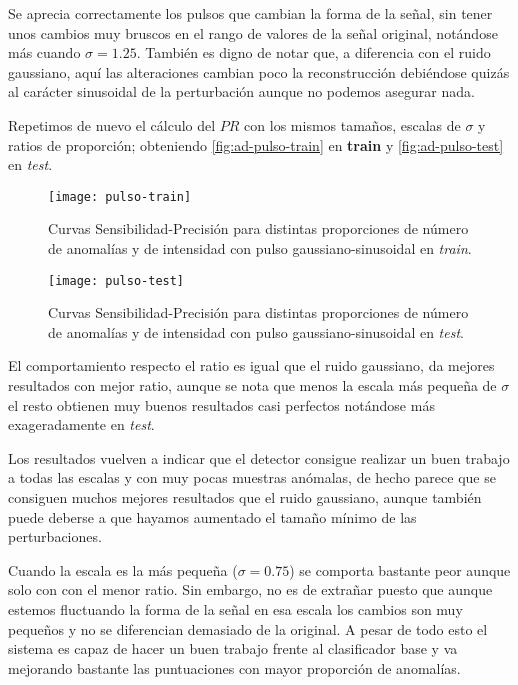 Se aprecia correctamente los pulsos que cambian la forma de la señal, sin tener unos cambios muy bruscos en el rango de valores de la señal original, notándose más cuando $\sigma = 1.25$. También es digno de notar que, a diferencia con el ruido gaussiano, aquí las alteraciones cambian poco la reconstrucción debiéndose quizás al carácter sinusoidal de la perturbación aunque no podemos asegurar nada.

Repetimos de nuevo el cálculo del $PR$ con los mismos tamaños, escalas de $\sigma$ y ratios de proporción; obteniendo \autoref{fig:ad-pulso-train} en \textbf{train} y \autoref{fig:ad-pulso-test} en \emph{test}.

\begin{figure}[htpb]
  \centering
  \texttt{[image: pulso-train]}
  \caption{Curvas Sensibilidad-Precisión para distintas proporciones de número de anomalías y de intensidad con pulso gaussiano-sinusoidal en \emph{train}.}
  \label{fig:ad-pulso-train}
\end{figure}

\begin{figure}[htpb]
  \centering
  \texttt{[image: pulso-test]}
  \caption{Curvas Sensibilidad-Precisión para distintas proporciones de número de anomalías y de intensidad con pulso gaussiano-sinusoidal en \emph{test}.}
  \label{fig:ad-pulso-test}
\end{figure}

El comportamiento respecto el ratio es igual que el ruido gaussiano, da mejores resultados con mejor ratio, aunque se nota que menos la escala más pequeña de $\sigma$ el resto obtienen muy buenos resultados casi perfectos notándose más exageradamente en \emph{test}.

Los resultados vuelven a indicar que el detector consigue realizar un buen trabajo a todas las escalas y con muy pocas muestras anómalas, de hecho parece que se consiguen muchos mejores resultados que el ruido gaussiano, aunque también puede deberse a que hayamos aumentado el tamaño mínimo de las perturbaciones.

Cuando la escala es la más pequeña ($\sigma = 0.75$) se comporta bastante peor aunque solo con con el menor ratio. Sin embargo, no es de extrañar puesto que aunque estemos fluctuando la forma de la señal en esa escala los cambios son muy pequeños y no se diferencian demasiado de la original. A pesar de todo esto el sistema es capaz de hacer un buen trabajo frente al clasificador base y va mejorando bastante las puntuaciones con mayor proporción de anomalías.

